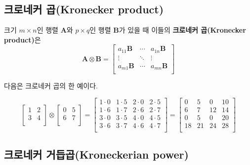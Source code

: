 \documentclass[b5paper,]{scrbook}
\theoremstyle{plain}
\theoremstyle{definition}
\numberwithin{equation}{section}
\let\BeginKnitrBlock\begin \let\EndKnitrBlock\end
\begin{document}
\hypertarget{-kronecker-product}{%
\subsection{크로네커 곱(Kronecker product)}\label{-kronecker-product}}

\BeginKnitrBlock{definition}[크로네커 곱]
\protect\hypertarget{def:unnamed-chunk-10}{}{\label{def:unnamed-chunk-10} {} }크기 \(m \times n\)인 행렬 \(\mathbf{A}\)와 \(p\times q\)인 행렬 \(\mathbf{B}\)가 있을 때 이들의 \textbf{크로네커 곱(Kronecker product)}은
\[\mathbf{A}\otimes\mathbf{B}
=
\begin{bmatrix}
a_{11}\mathbf{B} & \cdots & a_{1n}\mathbf{B} \\
\vdots & \ddots & \vdots \\
a_{m1}\mathbf{B} & \cdots & a_{mn}\mathbf{B} \\
\end{bmatrix}
\]
\EndKnitrBlock{definition}

\BeginKnitrBlock{example}[크로네커 곱의 예]
\protect\hypertarget{exm:unnamed-chunk-11}{}{\label{exm:unnamed-chunk-11} {} }다음은 크로네커 곱의 한 예이다.

\[
\begin{bmatrix}
1 & 2\\
3 & 4\\
\end{bmatrix}
\otimes
\begin{bmatrix}
0 & 5\\
6 & 7\\
\end{bmatrix}
=
\begin{bmatrix}
1\cdot 0 & 1\cdot 5 & 2\cdot 0 & 2\cdot 5\\
1\cdot 6 & 1\cdot 7 & 2\cdot 6 & 2\cdot 7\\
3\cdot 0 & 3\cdot 5 & 4\cdot 0 & 4\cdot 5\\
3\cdot 6 & 3\cdot 7 & 4\cdot 6 & 4\cdot 7\\
\end{bmatrix}
=
\begin{bmatrix}
0 & 5 & 0 & 10\\
6 & 7 & 12 & 14\\
0 & 5 & 0 & 20\\
18 & 21 & 24 & 28\\
\end{bmatrix}
\]
\EndKnitrBlock{example}

\hypertarget{-kroneckerian-power}{%
\subsection{크로네커 거듭곱(Kroneckerian power)}\label{-kroneckerian-power}}
\end{document}
